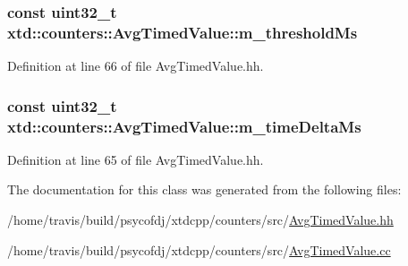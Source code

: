 \hypertarget{classxtd_1_1counters_1_1AvgTimedValue_a96ae1248a1019b22cf41bae4a47314c2}{
\subsubsection[{m\-\_\-threshold\-Ms}]{\setlength{\rightskip}{0pt plus 5cm}const uint32\-\_\-t xtd\-::counters\-::\-Avg\-Timed\-Value\-::m\-\_\-threshold\-Ms}}\label{classxtd_1_1counters_1_1AvgTimedValue_a96ae1248a1019b22cf41bae4a47314c2}


Definition at line 66 of file Avg\-Timed\-Value.\-hh.

\hypertarget{classxtd_1_1counters_1_1AvgTimedValue_a2986c9cf3526f6f86d340dafd25ae04f}{
\subsubsection[{m\-\_\-time\-Delta\-Ms}]{\setlength{\rightskip}{0pt plus 5cm}const uint32\-\_\-t xtd\-::counters\-::\-Avg\-Timed\-Value\-::m\-\_\-time\-Delta\-Ms}}\label{classxtd_1_1counters_1_1AvgTimedValue_a2986c9cf3526f6f86d340dafd25ae04f}


Definition at line 65 of file Avg\-Timed\-Value.\-hh.



The documentation for this class was generated from the following files\-:\begin{DoxyCompactItemize}
\item 
/home/travis/build/psycofdj/xtdcpp/counters/src/\hyperlink{AvgTimedValue_8hh}{Avg\-Timed\-Value.\-hh}\item 
/home/travis/build/psycofdj/xtdcpp/counters/src/\hyperlink{AvgTimedValue_8cc}{Avg\-Timed\-Value.\-cc}\end{DoxyCompactItemize}
